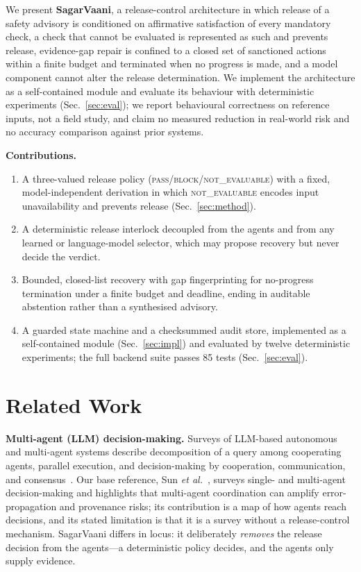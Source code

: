 \documentclass[conference]{IEEEtran}
\newcommand{\NE}{\textsc{not\_evaluable}}
\newcommand{\PASS}{\textsc{pass}}
\newcommand{\BLOCK}{\textsc{block}}
\begin{document}
We present \textbf{SagarVaani}, a release-control architecture in which release of a safety advisory is conditioned on affirmative satisfaction of every mandatory check, a check that cannot be evaluated is represented as such and prevents release, evidence-gap repair is confined to a closed set of sanctioned actions within a finite budget and terminated when no progress is made, and a model component cannot alter the release determination. We implement the architecture as a self-contained module and evaluate its behaviour with deterministic experiments (Sec.~\ref{sec:eval}); we report behavioural correctness on reference inputs, not a field study, and claim no measured reduction in real-world risk and no accuracy comparison against prior systems.

\noindent\textbf{Contributions.}
\begin{enumerate}
  \item A three-valued release policy (\PASS{}/\BLOCK{}/\NE{}) with a fixed, model-independent derivation in which \NE{} encodes input unavailability and prevents release (Sec.~\ref{sec:method}).
  \item A deterministic release interlock decoupled from the agents and from any learned or language-model selector, which may propose recovery but never decide the verdict.
  \item Bounded, closed-list recovery with gap fingerprinting for no-progress termination under a finite budget and deadline, ending in auditable abstention rather than a synthesised advisory.
  \item A guarded state machine and a checksummed audit store, implemented as a self-contained module (Sec.~\ref{sec:impl}) and evaluated by twelve deterministic experiments; the full backend suite passes 85 tests (Sec.~\ref{sec:eval}).
\end{enumerate}

\section{Related Work}
\textbf{Multi-agent (LLM) decision-making.} Surveys of LLM-based autonomous and multi-agent systems describe decomposition of a query among cooperating agents, parallel execution, and decision-making by cooperation, communication, and consensus~\cite{wang2024survey,guo2024multiagent}. Our base reference, Sun \emph{et al.}~\cite{sun2025llm}, surveys single- and multi-agent decision-making and highlights that multi-agent coordination can amplify error-propagation and provenance risks; its contribution is a map of how agents reach decisions, and its stated limitation is that it is a survey without a release-control mechanism. SagarVaani differs in locus: it deliberately \emph{removes} the release decision from the agents---a deterministic policy decides, and the agents only supply evidence.
\end{document}
